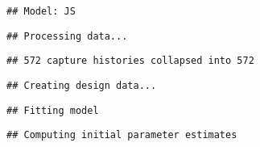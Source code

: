 \documentclass[]{article}
\newenvironment{Shaded}{\begin{snugshade}}{\end{snugshade}}
\newcommand{\KeywordTok}[1]{\textcolor[rgb]{0.13,0.29,0.53}{\textbf{#1}}}
\newcommand{\CommentTok}[1]{\textcolor[rgb]{0.56,0.35,0.01}{\textit{#1}}}
\newcommand{\OperatorTok}[1]{\textcolor[rgb]{0.81,0.36,0.00}{\textbf{#1}}}
\newcommand{\NormalTok}[1]{#1}
\begin{document}
\begin{verbatim}
## Model: JS
\end{verbatim}

\begin{verbatim}
## Processing data...
\end{verbatim}

\begin{verbatim}
## 572 capture histories collapsed into 572
\end{verbatim}

\begin{verbatim}
## Creating design data...
\end{verbatim}

\begin{verbatim}
## Fitting model
\end{verbatim}

\begin{verbatim}
## Computing initial parameter estimates
\end{verbatim}

\begin{Shaded}
\end{Shaded}
\end{document}
